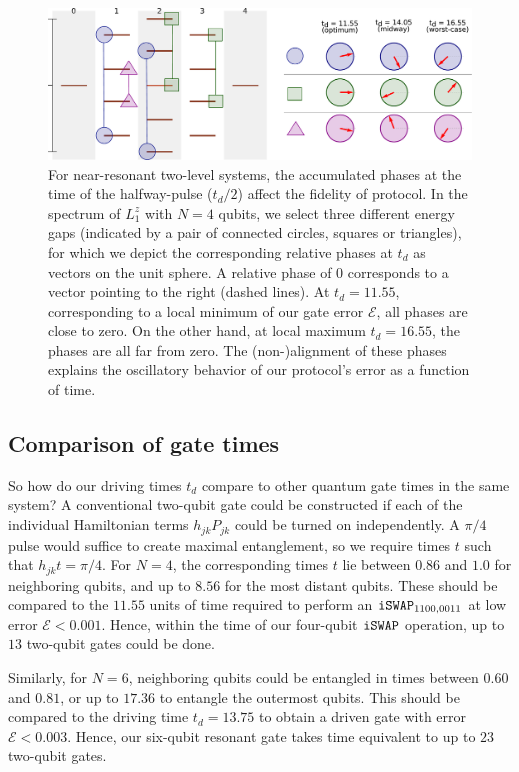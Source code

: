 \begin{figure}
\centering
%
%
%
\includegraphics[width=.99\textwidth]{img/phases_goodbad.pdf}
\caption{For near-resonant two-level systems, the accumulated phases at the time of the halfway-pulse ($t_d / 2$) affect the fidelity of protocol. In the spectrum of $L_1^z$ with $N=4$ qubits, we select three different energy gaps (indicated by a pair of connected circles, squares or triangles), for which we depict the corresponding relative phases at $t_d$ as vectors on the unit sphere. A relative phase of $0$ corresponds to a vector pointing to the right (dashed lines). At $t_d = 11.55$, corresponding to a local minimum of our gate error $\mathcal{E}$, all phases are close to zero. On the other hand, at local maximum $t_d = 16.55$, the phases are all far from zero. The (non-)alignment of these phases explains the oscillatory behavior of our protocol's error as a function of time. }
\label{fig:drivephases}
\end{figure}

\subsection{Comparison of gate times}
So how do our driving times $t_d$ compare to other quantum gate times in the same system? A conventional two-qubit gate could be constructed if each of the individual Hamiltonian terms $h_{jk} P_{jk}$ could be turned on independently. A $\pi/4$ pulse would suffice to create maximal entanglement, so we require times $t$ such that $h_{jk} t = \pi / 4$. For $N=4$, the corresponding times $t$ lie between $0.86$ and $1.0$ for neighboring qubits, and up to $8.56$ for the most distant qubits. These should be compared to the $11.55$ units of time required to perform an $\texttt{iSWAP}_{1100, 0011}$ at low  error $\mathcal{E} < 0.001$. Hence, within the time of our four-qubit $\texttt{iSWAP}$ operation, up to $13$ two-qubit gates could be done. 

Similarly, for $N=6$, neighboring qubits could be entangled in times between $0.60$ and $0.81$, or up to $17.36$ to entangle the outermost qubits. This should be compared to the driving time $t_d = 13.75$ to obtain a driven gate with error $\mathcal{E} < 0.003$. Hence, our six-qubit resonant gate takes time equivalent to up to $23$ two-qubit gates. 

